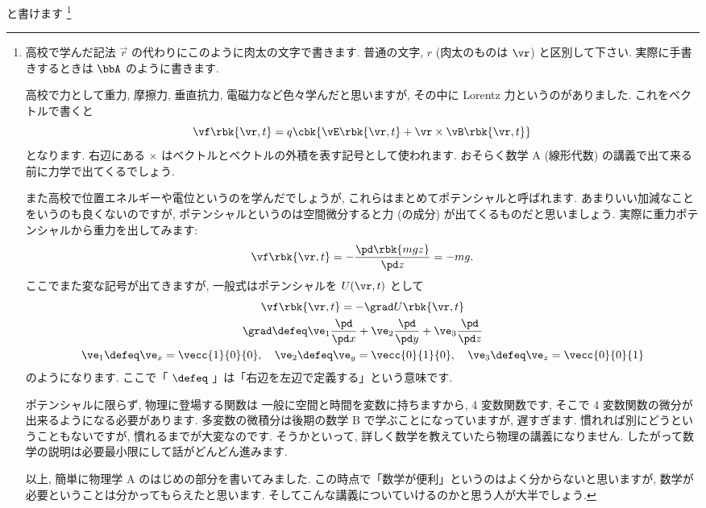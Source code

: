 \documentclass[openany, a4paper, oneside]{jsbook}
\begin{document}
と書けます \footnote{高校で学んだ記法 $\vec{r}$ の代わりにこのように肉太の文字で書きます.
普通の文字, $r$ (肉太のものは $\vr$) と区別して下さい.
実際に手書きするときは $\bbA$ のように書きます.

高校で力として重力, 摩擦力, 垂直抗力, 電磁力など色々学んだと思いますが,
その中に Lorentz 力というのがありました.
これをベクトルで書くと
\begin{equation}
 \vf \rbk{\vr,t } = q \cbk{ \vE  \rbk{ \vr ,t } + \vr \times \vB \rbk{\vr,t } }
\end{equation}
となります.
右辺にある $\times$ はベクトルとベクトルの外積を表す記号として使われます.
おそらく数学 A (線形代数) の講義で出て来る前に力学で出てくるでしょう.

また高校で位置エネルギーや電位というのを学んだでしょうが,
これらはまとめてポテンシャルと呼ばれます.
あまりいい加減なことをいうのも良くないのですが,
ポテンシャルというのは空間微分すると力 (の成分) が出てくるものだと思いましょう.
実際に重力ポテンシャルから重力を出してみます:
\begin{equation}
 \vf \rbk{ \vr,t } = - \frac{ \pd \rbk{ mgz }}{ \pd z} = -mg.
\end{equation}
ここでまた変な記号が出てきますが, 一般式はポテンシャルを $U ( \vr,t)$ として
\begin{gather}
 \vf \rbk{ \vr,t }
 =
 -\grad U \rbk{ \vr,t } \\
 \grad
 \defeq
 \ve_{1} \frac{ \pd }{\pd x} + \ve_{2} \frac{ \pd }{\pd y}
        +\ve_{3} \frac{ \pd }{\pd z} \\
 \ve_{1}
 \defeq
 \ve_{x}
 =
 \vecc{1}{0}{0}
 , \quad
 \ve_{2}
 \defeq
 \ve_{y}
 =
 \vecc{0}{1}{0}, \quad \ve_3
 \defeq
 \ve_{z}
 =
 \vecc{0}{0}{1}
\end{gather}
のようになります.
ここで「 $\defeq$ 」は「右辺を左辺で定義する」という意味です.

ポテンシャルに限らず, 物理に登場する関数は
一般に空間と時間を変数に持ちますから, 4 変数関数です,
そこで 4 変数関数の微分が出来るようになる必要があります.
多変数の微積分は後期の数学 B で学ぶことになっていますが, 遅すぎます.
慣れれば別にどうということもないですが, 慣れるまでが大変なのです.
そうかといって, 詳しく数学を教えていたら物理の講義になりません.
したがって数学の説明は必要最小限にして話がどんどん進みます.

以上, 簡単に物理学 A のはじめの部分を書いてみました.
この時点で「数学が便利」というのはよく分からないと思いますが,
数学が必要ということは分かってもらえたと思います.
そしてこんな講義についていけるのかと思う人が大半でしょう.

}
\end{document}
